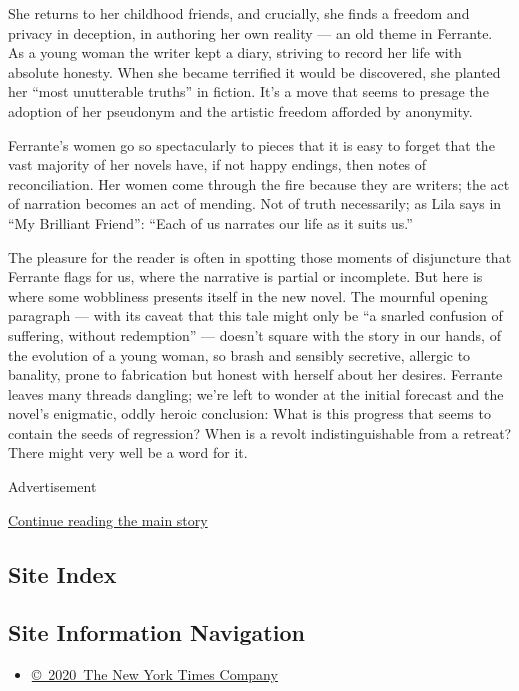 She returns to her childhood friends, and crucially, she finds a freedom
and privacy in deception, in authoring her own reality --- an old theme
in Ferrante. As a young woman the writer kept a diary, striving to
record her life with absolute honesty. When she became terrified it
would be discovered, she planted her ``most unutterable truths'' in
fiction. It's a move that seems to presage the adoption of her pseudonym
and the artistic freedom afforded by anonymity.

Ferrante's women go so spectacularly to pieces that it is easy to forget
that the vast majority of her novels have, if not happy endings, then
notes of reconciliation. Her women come through the fire because they
are writers; the act of narration becomes an act of mending. Not of
truth necessarily; as Lila says in ``My Brilliant Friend'': ``Each of us
narrates our life as it suits us.''

The pleasure for the reader is often in spotting those moments of
disjuncture that Ferrante flags for us, where the narrative is partial
or incomplete. But here is where some wobbliness presents itself in the
new novel. The mournful opening paragraph --- with its caveat that this
tale might only be ``a snarled confusion of suffering, without
redemption'' --- doesn't square with the story in our hands, of the
evolution of a young woman, so brash and sensibly secretive, allergic to
banality, prone to fabrication but honest with herself about her
desires. Ferrante leaves many threads dangling; we're left to wonder at
the initial forecast and the novel's enigmatic, oddly heroic conclusion:
What is this progress that seems to contain the seeds of regression?
When is a revolt indistinguishable from a retreat? There might very well
be a word for it.

Advertisement

\protect\hyperlink{after-bottom}{Continue reading the main story}

\hypertarget{site-index}{%
\subsection{Site Index}\label{site-index}}

\hypertarget{site-information-navigation}{%
\subsection{Site Information
Navigation}\label{site-information-navigation}}

\begin{itemize}
\tightlist
\item
  \href{https://help.nytimes3xbfgragh.onion/hc/en-us/articles/115014792127-Copyright-notice}{©~2020~The
  New York Times Company}
\end{itemize}

